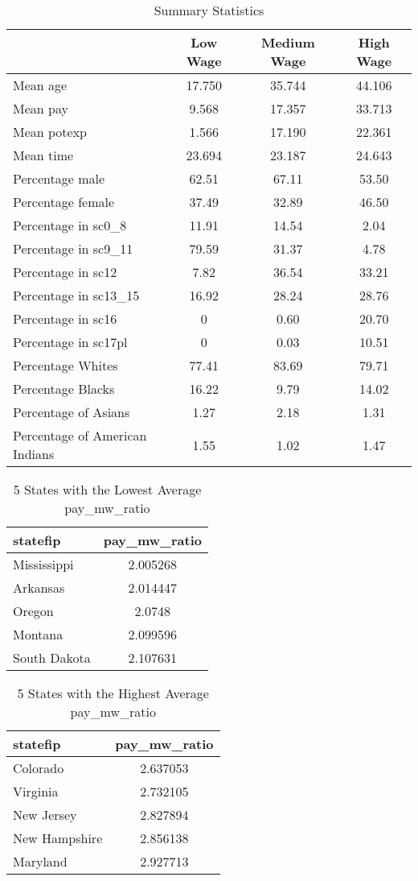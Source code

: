 \documentclass{article}
\begin{document}
\begin{table}[ht]
\centering
\caption{Summary Statistics}
\label{my-label}
\begin{tabular}{lccc}
\hline
			 & Low Wage & Medium Wage & High Wage \\
\hline
Mean age 	 & 17.750	& 35.744	& 44.106 \\
Mean pay		& 9.568	& 17.357	& 33.713 \\
Mean potexp		& 1.566	& 17.190		& 22.361 \\
Mean time		& 23.694 & 23.187		& 24.643 \\
Percentage male	& 62.51	&  67.11		& 53.50 \\
Percentage female	& 37.49	& 32.89		& 46.50 \\
Percentage in sc0\_8 	&11.91	&14.54 	& 2.04\\
Percentage in sc9\_11 	&79.59	& 31.37	&4.78 \\
Percentage in sc12	&7.82	&36.54 	&33.21\\
Percentage in sc13\_15	&16.92	&28.24	&28.76 \\
Percentage in sc16	  &0	& 0.60	&20.70 \\
Percentage in sc17pl	&0	&0.03	&10.51 \\
Percentage Whites & 77.41 &  83.69  & 79.71 \\
Percentage Blacks &16.22 & 9.79  & 14.02\\
Percentage of Asians &1.27 &2.18  & 1.31  \\
Percentage of American Indians &1.55 &1.02  & 1.47\\
\hline
\end{tabular}
\end{table}

\begin{table}[ht]
\centering
\caption{5 States with the Lowest Average pay\_mw\_ratio}
\label{my-label}
\begin{tabular}{lc}
\hline
statefip    & pay\_mw\_ratio \\
\hline
Mississippi & 2.005268       \\
Arkansas    & 2.014447       \\
Oregon      & 2.0748         \\
Montana     & 2.099596       \\
South Dakota    & 2.107631 \\
\hline
\end{tabular}
\end{table}

\begin{table}[ht]
\centering
\caption{5 States with the Highest Average pay\_mw\_ratio}
\label{my-label}
\begin{tabular}{lc}
\hline
statefip    & pay\_mw\_ratio \\
\hline
Colorado & 2.637053       \\
Virginia & 2.732105       \\
New Jersey   & 2.827894         \\
New Hampshire   & 2.856138       \\
Maryland    & 2.927713 \\
\hline
\end{tabular}
\end{table}
\end{document}
